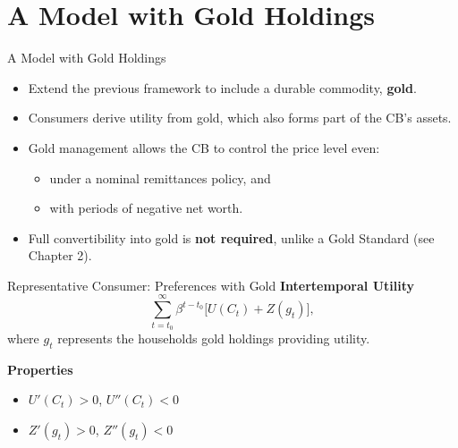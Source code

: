 \documentclass[11pt,aspectratio=169]{beamer}
\begin{document}
\section{A Model with Gold Holdings}

\begin{frame}{A Model with Gold Holdings}
\begin{itemize}
    \item Extend the previous framework to include a durable commodity, \textbf{gold}.
    \vspace{0.2cm}
    \item Consumers derive utility from gold, which also forms part of the CB's assets.
    \vspace{0.2cm}
    \item Gold management allows the CB to control the price level even:
    \begin{itemize}
        \item under a nominal remittances policy, and
        \item with periods of negative net worth.
    \end{itemize}
    \vspace{0.2cm}
    \item Full convertibility into gold is \textbf{not required}, unlike a Gold Standard (see Chapter 2).
\end{itemize}
\end{frame}

\begin{frame}{Representative Consumer: Preferences with Gold}
\textbf{Intertemporal Utility}
\begin{equation}
\sum_{t=t_0}^{\infty} \beta^{t-t_0} \big[ U(C_t) + Z(g_t) \big],
\label{eq: utility_gold}
\end{equation}
where $g_t$ represents the households gold holdings providing utility.

\vspace{0.3cm}
\textbf{Properties}
\begin{itemize}
  \item $U'(C_t) > 0$, $U''(C_t) < 0$ 
  \item $Z'(g_t) > 0$, $Z''(g_t) < 0$
\end{itemize}
\end{frame}
\end{document}
